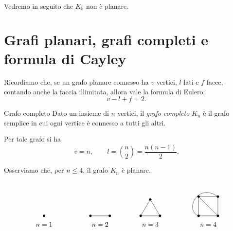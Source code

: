 \documentclass[a4paper]{article}
\begin{document}
Vedremo in seguito che \(K_5\) non è planare.

\section{Grafi planari, grafi completi e formula di Cayley}

Ricordiamo che, se un grafo planare connesso ha \(v\) vertici, \(l\) lati e \(f\) facce, contando anche la faccia illimitata, allora vale la formula di Eulero:
\[
    v-l+f=2.
\]

\begin{snippetdefinition}{Grafo completo}
    Dato un insieme di \(n\) vertici, il \emph{grafo completo} \(K_n\) è il grafo semplice in cui ogni vertice è connesso a tutti gli altri.

    Per tale grafo si ha
    \[
        v=n,
        \qquad
        l=\binom{n}{2}=\frac{n(n-1)}{2}.
    \]
\end{snippetdefinition}

Osserviamo che, per \(n\leq 4\), il grafo \(K_n\) è planare.

\[
\begin{tikzpicture}[scale=1]
    \begin{scope}
        \fill (0,0) circle (1.8pt);
        \node at (0,-0.45) {\(n=1\)};
    \end{scope}

    \begin{scope}[xshift=2.4cm]
        \coordinate (a) at (0,0);
        \coordinate (b) at (1,0);

        \draw (a)--(b);

        \fill (a) circle (1.8pt);
        \fill (b) circle (1.8pt);

        \node at (0.5,-0.45) {\(n=2\)};
    \end{scope}

    \begin{scope}[xshift=5cm]
        \coordinate (a) at (0,0);
        \coordinate (b) at (1,0);
        \coordinate (c) at (0.5,0.85);

        \draw (a)--(b)--(c)--cycle;

        \foreach \p in {a,b,c}{
            \fill (\p) circle (1.8pt);
        }

        \node at (0.5,-0.45) {\(n=3\)};
    \end{scope}

    \begin{scope}[xshift=8cm]
        \coordinate (a) at (0,0);
        \coordinate (b) at (1,0);
        \coordinate (c) at (1,1);
        \coordinate (d) at (0,1);

        \draw (a)--(b)--(c)--(d)--cycle;
        \draw (d)--(b);
        \draw (a) .. controls +(-0.75,0.30) and +(-1.05,0.75) .. (c);

        \foreach \p in {a,b,c,d}{
            \fill (\p) circle (1.8pt);
        }

        \node at (0.5,-0.45) {\(n=4\)};
    \end{scope}
\end{tikzpicture}
\]
\end{document}

